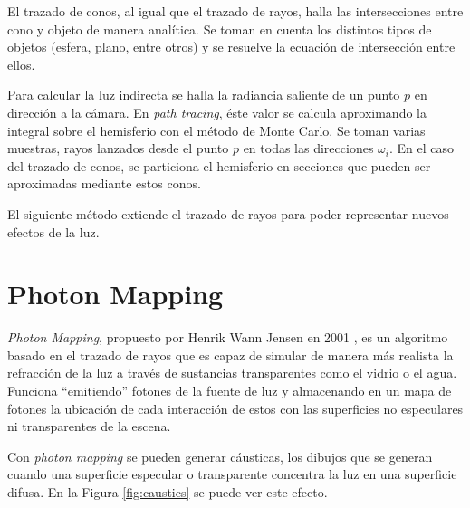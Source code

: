 El trazado de conos, al igual que el trazado de rayos, halla las intersecciones entre cono y objeto de manera analítica.
Se toman en cuenta los distintos tipos de objetos (esfera, plano, entre otros) y se resuelve la ecuación de intersección entre ellos.


Para calcular la luz indirecta se halla la radiancia saliente de un punto $p$ en dirección a la cámara.
En \textit{path tracing}, éste valor se calcula aproximando la integral sobre el hemisferio con el método de Monte Carlo.
Se toman varias muestras, rayos lanzados desde el punto $p$ en todas las direcciones $\omega_i$.
En el caso del trazado de conos, se particiona el hemisferio en secciones que pueden ser aproximadas mediante estos conos.

El siguiente método extiende el trazado de rayos para poder representar nuevos efectos de la luz.

\section{Photon Mapping}\label{sec:photon-mapping}

\textit{Photon Mapping}, propuesto por Henrik Wann Jensen en 2001 \cite{photon-mapping}, es un algoritmo basado en el trazado de rayos que es capaz de simular de manera más realista la refracción de la luz a través de sustancias transparentes como el vidrio o el agua. 
Funciona ``emitiendo'' fotones de la fuente de luz y almacenando en un mapa de fotones la ubicación de cada interacción de estos con las superficies no especulares ni transparentes de la escena.

Con \textit{photon mapping} se pueden generar cáusticas, los dibujos que se generan cuando una superficie especular o transparente concentra la luz en una superficie difusa.
En la Figura \ref{fig:caustics} se puede ver este efecto.

